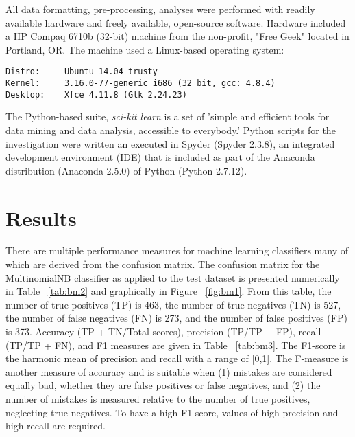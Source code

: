 \documentclass[twoside]{article}	%
\begin{document}
\noindent All data formatting, pre-processing, analyses were performed with readily available hardware and freely available, open-source software. Hardware included a HP Compaq 6710b (32-bit) machine from the non-profit, "Free Geek" located in Portland, OR. The machine used a Linux-based operating system:  
\begin{verbatim}
Distro:		Ubuntu 14.04 trusty
Kernel:		3.16.0-77-generic i686 (32 bit, gcc: 4.8.4)
Desktop: 	Xfce 4.11.8 (Gtk 2.24.23) 	
\end{verbatim}

\noindent The Python-based suite, \textit{sci-kit learn} is a set of 'simple and efficient tools for data mining and data analysis, accessible to everybody.' Python scripts for the investigation were written an executed in Spyder (Spyder 2.3.8), an integrated development environment (IDE) that is included as part of the Anaconda distribution (Anaconda 2.5.0) of Python (Python 2.7.12). 	


\section{Results}
There are multiple performance measures for machine learning classifiers many of which are derived from the confusion matrix. The confusion matrix for the MultinomialNB classifier as applied to the test dataset is presented numerically in Table ~\ref{tab:bm2} and graphically in Figure ~\ref{fig:bm1}. From this table, the number of true positives (TP) is 463, the number of true negatives (TN) is 527, the number of false negatives (FN) is 273, and the number of false positives (FP) is 373.  Accuracy (TP + TN/Total scores), precision (TP/TP + FP), recall (TP/TP + FN), and F1 measures are given in Table ~\ref{tab:bm3}. The F1-score is the harmonic mean of precision and recall with a range of [0,1]. The F-measure is another measure of accuracy and is suitable when (1) mistakes are considered equally bad, whether they are false positives or false negatives, and (2) the number of mistakes is measured relative to the number of true positives, neglecting true negatives. To have a high F1 score, values of high precision and high recall are required.\\
\end{document}

